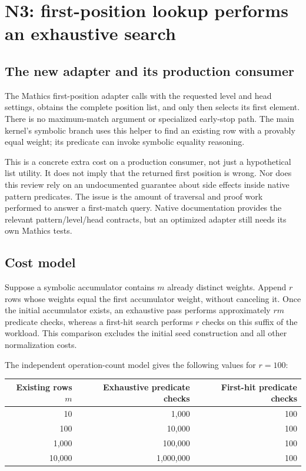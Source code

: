 \documentclass[11pt,letterpaper]{article}
\newcommand{\code}[1]{\texttt{\detokenize{#1}}}
\begin{document}
\section{N3: first-position lookup performs an exhaustive search}
\label{sec:n3}

\subsection{The new adapter and its production consumer}

The Mathics first-position adapter calls \code{Position} with the requested level and head settings, obtains the complete position list, and only then selects its first element. There is no maximum-match argument or specialized early-stop path. The main kernel's symbolic \code{jetMerge} branch uses this helper to find an existing row with a provably equal weight; its predicate can invoke symbolic equality reasoning.~\cite{mcompat,core}

This is a concrete extra cost on a production consumer, not just a hypothetical list utility. It does not imply that the returned first position is wrong. Nor does this review rely on an undocumented guarantee about side effects inside native pattern predicates. The issue is the amount of traversal and proof work performed to answer a first-match query. Native documentation provides the relevant pattern/level/head contracts, but an optimized adapter still needs its own Mathics tests.~\cite{wlfirst,wlposition}

\subsection{Cost model}

Suppose a symbolic accumulator contains $m$ already distinct weights. Append $r$ rows whose weights equal the first accumulator weight, without canceling it. Once the initial accumulator exists, an exhaustive pass performs approximately $rm$ predicate checks, whereas a first-hit search performs $r$ checks on this suffix of the workload. This comparison excludes the initial seed construction and all other normalization costs.

The independent operation-count model gives the following values for $r=100$:
\begin{center}\small
\begin{tabular}{@{}rrr@{}}
\toprule
Existing rows $m$ & Exhaustive predicate checks & First-hit predicate checks \\
\midrule
10 & 1,000 & 100 \\
100 & 10,000 & 100 \\
1,000 & 100,000 & 100 \\
10,000 & 1,000,000 & 100 \\
\bottomrule
\end{tabular}
\end{center}
\end{document}
